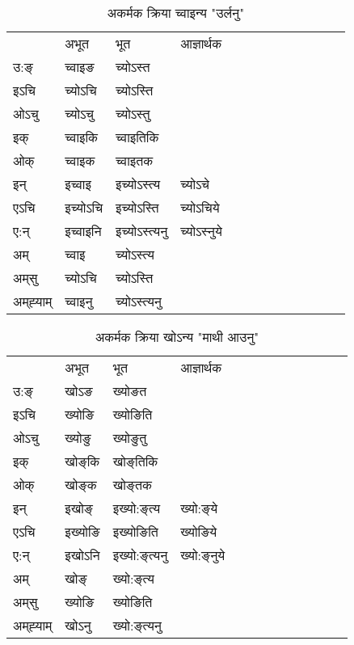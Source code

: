 \begin{table}[H]
\centering
\caption{\label{on.vi} अकर्मक क्रिया  च्‍वाइन्य  "उर्लनु"  }
\begin{tabular}{l|l|l|l|l|l|l|l|l|l|l|l|l}  \toprule
&अभूत & भूत & आज्ञार्थक \\ 
उ:ङ्‌ &च्‍वाइङ &च्योऽस्त \\ 
इऽचि &च्योऽचि &च्योऽस्ति   \\ 
ओऽचु &च्योऽचु &च्योऽस्तु   \\ 
इक् &च्‍वाइकि &च्‍वाइतिकि   \\ 
ओक् &च्‍वाइक &च्‍वाइतक   \\ 
इन् & इच्‍वाइ & इच्योऽस्त्य &च्योऽचे  \\ 
एऽचि & इच्योऽचि & इच्योऽस्ति &च्योऽचिये    \\ 
ए:न् & इच्‍वाइनि  & इच्योऽस्त्यनु &च्योऽस्‍नुये  \\ 
अम् & च्‍वाइ & च्योऽस्त्य   \\ 
अम्‌सु & च्योऽचि & च्योऽस्ति   \\ 
अम्‌ह्‍याम् & च्‍वाइनु  & च्योऽस्त्यनु \\ 
\bottomrule
\end{tabular}
\end{table}


\begin{table}[H]
\centering
\caption{\label{oŋ.vi} अकर्मक क्रिया  खोऽन्य  "माथी आउनु"  }
\begin{tabular}{l|l|l|l|l|l|l|l|l|l|l|l|l}  \toprule
&अभूत & भूत & आज्ञार्थक \\ 
उ:ङ्‌ &खोऽङ &ख्योङत \\ 
इऽचि &ख्योङि &ख्योङिति   \\ 
ओऽचु &ख्योङु &ख्योङुतु   \\ 
इक् &खोङ्‌कि &खोङ्‌तिकि   \\ 
ओक् &खोङ्‌क &खोङ्‌तक   \\ 
इन् & इखोङ्‌ & इख्यो:ङ्‌त्य &ख्यो:ङ्‌ये  \\ 
एऽचि & इख्योङि & इख्योङिति &ख्योङिये    \\ 
ए:न् & इखोऽनि  & इख्यो:ङ्‌त्यनु &ख्यो:ङ्‌नुये  \\ 
अम् & खोङ्‌ & ख्यो:ङ्‌त्य   \\ 
अम्‌सु & ख्योङि & ख्योङिति   \\ 
अम्‌ह्‍याम् & खोऽनु  & ख्यो:ङ्‌त्यनु \\ 
\bottomrule
\end{tabular}
\end{table}


